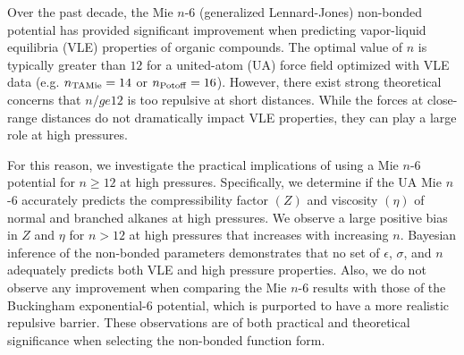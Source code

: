 \documentclass[11pt,a4paper]{article}
\begin{document}
	Over the past decade, the Mie $n$-6 (generalized Lennard-Jones) non-bonded potential has provided significant improvement when predicting vapor-liquid equilibria (VLE) properties of organic compounds. The optimal value of $n$ is typically greater than $12$ for a united-atom (UA) force field optimized with VLE data (e.g. $n_{\rm TAMie}= 14$ or $n_{\rm Potoff} = 16$). However, there exist strong theoretical concerns that $n /ge 12$ is too repulsive at short distances. While the forces at close-range distances do not dramatically impact VLE properties, they can play a large role at high pressures.
	
	For this reason, we investigate the practical implications of using a Mie $n$-6 potential for $n\ge12$ at high pressures. Specifically, we determine if the UA Mie $n$-6 accurately predicts the compressibility factor $(Z)$ and viscosity $(\eta)$ of normal and branched alkanes at high pressures. We observe a large positive bias in $Z$ and $\eta$ for $n>12$ at high pressures that increases with increasing $n$. Bayesian inference of the non-bonded parameters demonstrates that no set of $\epsilon$, $\sigma$, and $n$ adequately predicts both VLE and high pressure properties. Also, we do not observe any improvement when comparing the Mie $n$-6 results with those of the Buckingham exponential-6 potential, which is purported to have a more realistic repulsive barrier. These observations are of both practical and theoretical significance when selecting the non-bonded function form.
	
\end{document}
